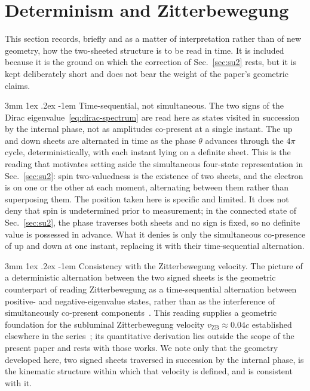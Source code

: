 \documentclass[%
 reprint, amsmath,amssymb, aps, prb, ]{revtex4-2}
\makeatletter
\numberwithin{equation}{section}
\renewcommand\paragraph{%
  \@startsection{paragraph}{4}{\z@}%
    {3mm \@plus 1ex \@minus .2ex}%
    {-1em}%
    {\normalfont\normalsize\itshape}}
\newcommand{\iphase}{\theta}  %
\newcommand{\vZB}{v_{\text{ZB}}}
\makeatother
\begin{document}
\section{Determinism and Zitterbewegung}
\label{sec:zb}

This section records, briefly and as a matter of interpretation rather than of new geometry, how the two-sheeted structure is to be read in time. It is included because it is the ground on which the correction of Sec.~\ref{sec:su2} rests, but it is kept deliberately short and does not bear the weight of the paper's geometric claims.

\paragraph{Time-sequential, not simultaneous.}
The two signs of the Dirac eigenvalue~\eqref{eq:dirac-spectrum} are read here as states visited in succession by the internal phase, not as amplitudes co-present at a single instant. The up and down sheets are alternated in time as the phase $\iphase$ advances through the $4\pi$ cycle, deterministically, with each instant lying on a definite sheet. This is the reading that motivates setting aside the simultaneous four-state representation in Sec.~\ref{sec:su2}: spin two-valuedness is the existence of two sheets, and the electron is on one or the other at each moment, alternating between them rather than superposing them. The position taken here is specific and limited. It does not deny that spin is undetermined prior to measurement; in the connected state of Sec.~\ref{sec:su2}, the phase traverses both sheets and no sign is fixed, so no definite value is possessed in advance. What it denies is only the simultaneous co-presence of up and down at one instant, replacing it with their time-sequential alternation.

\paragraph{Consistency with the Zitterbewegung velocity.}
The picture of a deterministic alternation between the two signed sheets is the geometric counterpart of reading Zitterbewegung as a time-sequential alternation between positive- and negative-eigenvalue states, rather than as the interference of simultaneously co-present components~\cite{Schrodinger1930}. This reading supplies a geometric foundation for the subluminal Zitterbewegung velocity $\vZB \approx 0.04c$ established elsewhere in the series~\cite{hanamura10,hanamura48,hanamura51}; its quantitative derivation lies outside the scope of the present paper and rests with those works. We note only that the geometry developed here, two signed sheets traversed in succession by the internal phase, is the kinematic structure within which that velocity is defined, and is consistent with it.
\end{document}
